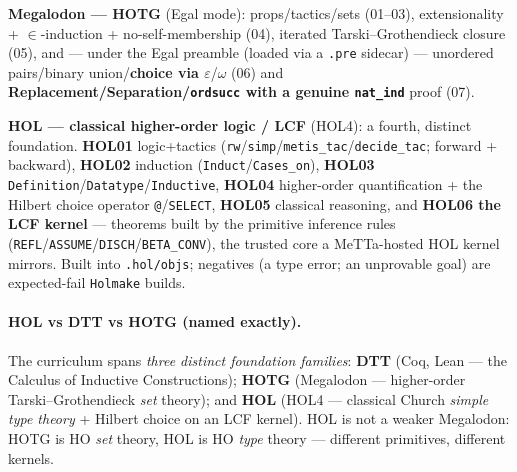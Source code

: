 \documentclass[11pt]{article}
\begin{document}
\smallskip\noindent\textbf{Megalodon --- HOTG} (Egal mode): props/tactics/sets (01--03),
extensionality + $\in$-induction + no-self-membership (04), iterated Tarski--Grothendieck closure
(05), and --- under the Egal preamble (loaded via a \texttt{.pre} sidecar) --- unordered pairs/binary
union/\textbf{choice via $\varepsilon$}/$\omega$ (06) and \textbf{Replacement/Separation/\texttt{ordsucc}
with a genuine \texttt{nat\_ind}} proof (07).

\smallskip\noindent\textbf{HOL --- classical higher-order logic / LCF} (HOL4): a fourth, distinct
foundation. \textbf{HOL01} logic+tactics (\texttt{rw}/\texttt{simp}/\texttt{metis\_tac}/\texttt{decide\_tac};
forward + backward), \textbf{HOL02} induction (\texttt{Induct}/\texttt{Cases\_on}), \textbf{HOL03}
\texttt{Definition}/\texttt{Datatype}/\texttt{Inductive}, \textbf{HOL04} higher-order quantification +
the Hilbert choice operator \texttt{@}/\texttt{SELECT}, \textbf{HOL05} classical reasoning, and
\textbf{HOL06 the LCF kernel} --- theorems built by the primitive inference rules
(\texttt{REFL}/\texttt{ASSUME}/\texttt{DISCH}/\texttt{BETA\_CONV}), the trusted core a MeTTa-hosted HOL
kernel mirrors. Built into \texttt{.hol/objs}; negatives (a type error; an unprovable goal) are
expected-fail \texttt{Holmake} builds.

\paragraph{HOL vs DTT vs HOTG (named exactly).} The curriculum spans \emph{three distinct foundation
families}: \textbf{DTT} (Coq, Lean --- the Calculus of Inductive Constructions); \textbf{HOTG}
(Megalodon --- higher-order Tarski--Grothendieck \emph{set} theory); and \textbf{HOL} (HOL4 ---
classical Church \emph{simple type theory} + Hilbert choice on an LCF kernel). HOL is not a weaker
Megalodon: HOTG is HO \emph{set} theory, HOL is HO \emph{type} theory --- different primitives,
different kernels.
\end{document}
